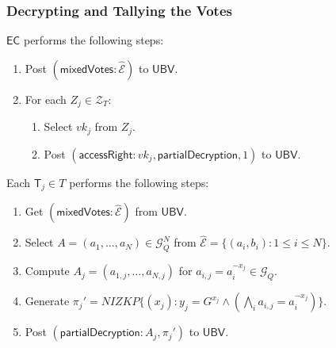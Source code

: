 \documentclass[bibtotoc,halfparskip,oneside]{scrreprt}
\newcommand{\vk}[1]{\mathit{vk}_{#1}\xspace}
\newcommand{\EC}{\ensuremath{\mathsf{EC}}\xspace}
\newcommand{\UBV}{\ensuremath{\mathsf{UBV}}\xspace}
\newcommand{\Tallier}[1]{\ensuremath{\mathsf{T}_{#1}}\xspace}
\begin{document}
	\subsubsection{Decrypting and Tallying the Votes}
	
	\EC performs the following steps:
	\begin{enumerate}	
		\item Post $(\mathsf{mixedVotes}:\hat{\mathcal{E}})$ to \UBV.
		\item For each $Z_{j}\in \mathcal{Z}_{T}$:
		\begin{enumerate}
			\item Select $\vk{j}$ from $Z_{j}$.
			\item Post $(\mathsf{accessRight}:\vk{j},\mathsf{partialDecryption},1)$ to \UBV.
		\end{enumerate}
	\end{enumerate}
	
	Each $\Tallier{j}\in T$ performs the following steps:
	\begin{enumerate}
		\item Get $(\mathsf{mixedVotes}:\hat{\mathcal{E}})$ from \UBV.
		\item Select $A=(a_1,\ldots,a_N)\in\mathcal{G}_Q^N$ from $\hat{\mathcal{E}}=\{(a_i,b_i):1\leq i\leq N\}$. 
		
		\item Compute $A_j = (a_{1,j},\ldots,a_{N,j})$ for $a_{i,j} = a_i^{-x_j}\in\mathcal{G}_Q$.
		\item Generate $\pi_{j}'=\mathit{NIZKP}\{(x_j):y_j=G^{x_j} \wedge \left(\bigwedge_i a_{i,j} = a_i^{-x_j}\right)\}$.
		\item Post $(\mathsf{partialDecryption}:A_j,\pi_{j}')$ to \UBV.
	\end{enumerate}
	
\end{document}
